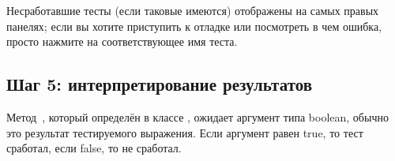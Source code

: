 \documentclass[a4paper,10pt,twoside]{book}
\begin{document}

Несработавшие тесты (если таковые имеются) отображены на самых правых панелях;
если вы хотите приступить к отладке или посмотреть в чем ошибка, просто нажмите на соответствующее имя теста.


\subsection{Шаг 5: интерпретирование результатов}

Метод \,, который определён в классе ,
ожидает аргумент типа boolean, обычно это результат тестируемого выражения.
Если аргумент равен true, то тест сработал, если false, то не сработал.
\end{document}

